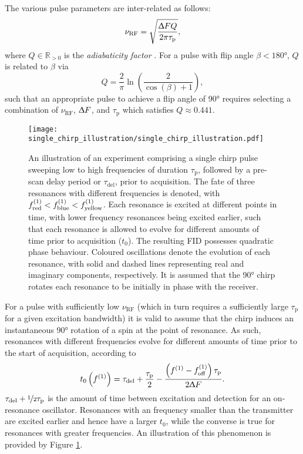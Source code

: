 The various pulse parameters are inter-related as follows:
\begin{equation}
    \nu_{\text{RF}} = \sqrt{
        \frac{\Updelta F Q}{2 \pi \tau_{\text{p}}}
    },
\end{equation}
where $Q \in \mathbb{R}_{>0}$ is the \emph{adiabaticity factor} . For a pulse with flip angle  $\beta < \ang{180}$,  $Q$ is
related to $\beta$ via
\begin{equation}
    Q = \frac{2}{\pi} \ln \left( \frac{2}{\cos(\beta) + 1} \right),
\end{equation}
such that an appropriate pulse to achieve a flip angle of \ang{90} requires
selecting a combination of $\nu_{\text{RF}}$, $\Updelta F$, and
$\tau_{\text{p}}$ which satisfies $Q \approx 0.441$.

\begin{figure}
    \centering
    \texttt{[image: single\_chirp\_illustration/single\_chirp\_illustration.pdf]}
    \caption[
        An illustration of an experiment comprising a single chirp pulse.
    ]
    {
        An illustration of an experiment comprising a single chirp pulse sweeping
        low to high frequencies of duration $\tau_{\text{p}}$, followed by
        a pre-scan delay period or $\tau_{\text{del}}$, prior to
        acquisition. The fate of three resonances with different frequencies is
        denoted, with $f^{(1)}_{\text{red}} < f^{(1)}_{\text{blue}} <
        f^{(1)}_{\text{yellow}}$. Each resonance is excited at different points
        in time, with lower frequency resonances being excited earlier, such that
        each resonance is allowed to evolve for different amounts of time prior
        to acquisition ($t_0$).
        The resulting \ac{FID} possesses quadratic phase behaviour.
        Coloured oscillations denote the evolution of each resonance, with
        solid and dashed lines representing real and imaginary components,
        respectively. It is assumed that the \ang{90} chirp rotates each
        resonance to be initially in phase with the receiver.
    }
    \label{fig:single-chirp}
\end{figure}

For a pulse with sufficiently low $\nu_{\text{RF}}$ (which in turn requires a
sufficiently large $\tau_{\text{p}}$ for a given excitation bandwidth) it is
valid to assume that the chirp induces an instantaneous \ang{90} rotation
of a spin at the point of resonance. As such, resonances with different
frequencies evolve for different amounts of time prior to the start of
acquisition, according to
\begin{equation}
    t_0\left( f^{(1)} \right) =
        \tau_{\text{del}} + \frac{\tau_{\text{p}}}{2} -
        \frac{\left( f^{(1)} - f_{\mathrm{off}}^{(1)} \right) \tau_{\text{p}}}{2 \Updelta F}.
    \label{eq:t0}
\end{equation}
$\tau_{\text{del}} + \nicefrac{1}{2} \tau_{\text{p}}$ is the amount of time
between excitation and detection for an on-resonance oscillator. Resonances
with an frequency smaller than the transmitter are excited earlier and hence
have a larger $t_0$, while the converse is true for resonances with greater
frequencies. An illustration of this phenomenon is provided by Figure
\ref{fig:single-chirp}.

